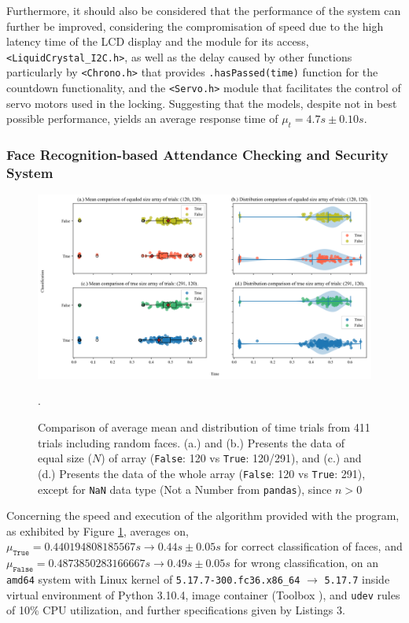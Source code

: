 \documentclass[12pt]{article}
\begin{document}
Furthermore, it should also be considered that the performance of the system can further be improved, considering the compromisation of speed due to the high latency time of the LCD display and the module for its access, \texttt{<LiquidCrystal\_I2C.h>}, as well as the delay caused by other functions particularly by \texttt{<Chrono.h>} that provides \texttt{.hasPassed(time)} function for the countdown functionality, and the \texttt{<Servo.h>} module that facilitates the control of servo motors used in the locking. Suggesting that the models, despite not in best possible performance, yields an average response time of $\mu_t = 4.7s \pm 0.10s$.

\subsubsection*{Face Recognition-based Attendance Checking and Security System}

\begin{figure}[h!]
	\centering
	\includegraphics[width=\textwidth]{fig_2da.png}
	\caption{\doublespacing Comparison of average mean and distribution of time trials from 411 trials including random faces. (a.) and (b.) Presents the data of equal size ($N$) of array (\texttt{False}: 120 vs \texttt{True}: 120/291), and (c.) and (d.) Presents the data of the whole array (\texttt{False}: 120 vs \texttt{True}: 291), except for \texttt{NaN} data type (Not a Number from \texttt{pandas}), since $n > 0$\centering}. \label{fig:8}
\end{figure}

Concerning the speed and execution of the algorithm provided with the program, as exhibited by Figure \ref{fig:8}, averages on, $\mu_{\texttt{True}} = 0.440194808185567s \longrightarrow 0.44s \pm 0.05s$ for correct classification of faces, and $\mu_{\texttt{False}} = 0.4873850283166667s \longrightarrow 0.49s \pm 0.05s$ for wrong classification, on an \texttt{amd64} system with Linux kernel of \texttt{5.17.7-300.fc36.x86\_64} $\longrightarrow$ \texttt{5.17.7} inside virtual environment of Python 3.10.4, image container (Toolbox ), and \texttt{udev} rules of 10\% CPU utilization, and further specifications given by Listings 3.
\end{document}
